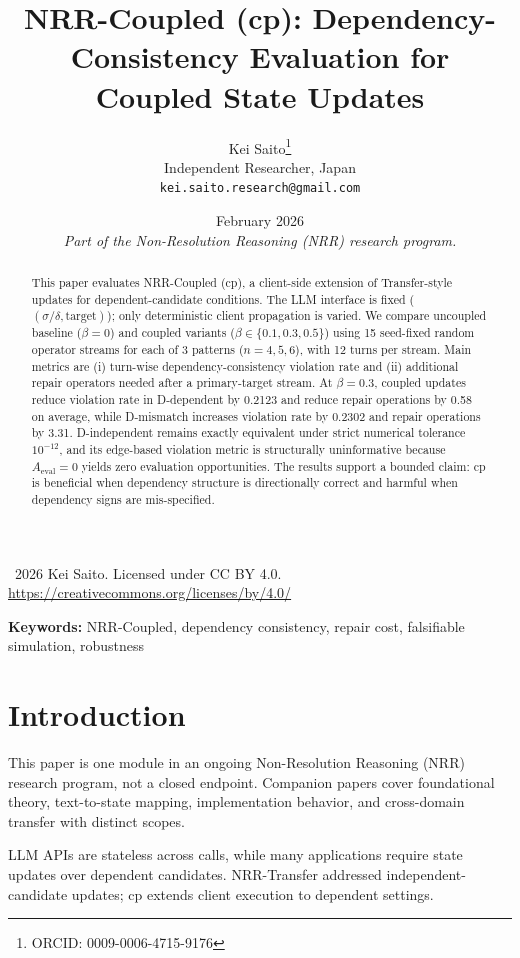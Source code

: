 \documentclass[11pt,a4paper]{article}
\title{\textbf{NRR-Coupled (cp): Dependency-Consistency Evaluation for Coupled State Updates}}
\author{Kei Saito\thanks{ORCID: 0009-0006-4715-9176}\\Independent Researcher, Japan\\\texttt{kei.saito.research@gmail.com}}
\date{February 2026\\[0.5em]\textit{Part of the Non-Resolution Reasoning (NRR) research program.}}
\begin{document}
\maketitle

\begin{center}
\textcopyright\ 2026 Kei Saito. Licensed under CC BY 4.0.\\
\url{https://creativecommons.org/licenses/by/4.0/}
\end{center}

\begin{abstract}
This paper evaluates NRR-Coupled (cp), a client-side extension of Transfer-style updates for dependent-candidate conditions. The LLM interface is fixed (\((\sigma/\delta,\text{target})\)); only deterministic client propagation is varied. We compare uncoupled baseline (\(\beta=0\)) and coupled variants (\(\beta\in\{0.1,0.3,0.5\}\)) using 15 seed-fixed random operator streams for each of 3 patterns (\(n=4,5,6\)), with 12 turns per stream. Main metrics are (i) turn-wise dependency-consistency violation rate and (ii) additional repair operators needed after a primary-target stream. At \(\beta=0.3\), coupled updates reduce violation rate in D-dependent by 0.2123 and reduce repair operations by 0.58 on average, while D-mismatch increases violation rate by 0.2302 and repair operations by 3.31. D-independent remains exactly equivalent under strict numerical tolerance \(10^{-12}\), and its edge-based violation metric is structurally uninformative because \(A_{\text{eval}}=0\) yields zero evaluation opportunities. The results support a bounded claim: cp is beneficial when dependency structure is directionally correct and harmful when dependency signs are mis-specified.
\end{abstract}

\noindent\textbf{Keywords:} NRR-Coupled, dependency consistency, repair cost, falsifiable simulation, robustness

\section{Introduction}
This paper is one module in an ongoing Non-Resolution Reasoning (NRR) research program, not a closed endpoint. Companion papers cover foundational theory, text-to-state mapping, implementation behavior, and cross-domain transfer with distinct scopes.

LLM APIs are stateless across calls, while many applications require state updates over dependent candidates. NRR-Transfer addressed independent-candidate updates; cp extends client execution to dependent settings.
\end{document}
